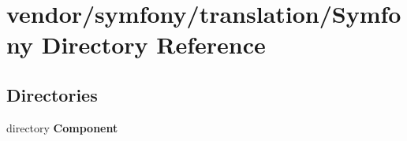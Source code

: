 \section{vendor/symfony/translation/\+Symfony Directory Reference}
\label{dir_e0187935564c60b6009cd2d46a5ccb07}
\subsection*{Directories}
\begin{DoxyCompactItemize}
\item 
directory {\bf Component}
\end{DoxyCompactItemize}
